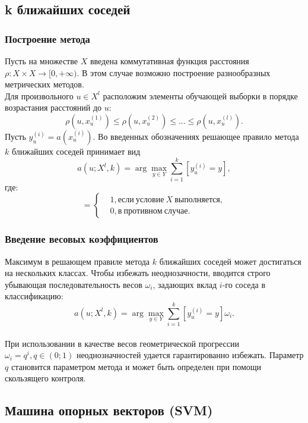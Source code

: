 \documentclass{beamer}
\begin{document}
\subsection{k ближайших соседей}
\begin{frame}
\end{frame}

\begin{frame}
\frametitle{Построение метода}
Пусть на множестве $X$ введена коммутативная функция расстояния $\rho:X\times X\rightarrow[0,+\infty)$. В этом случае возможно построение разнообразных метрических методов.\\
Для произвольного $u\in X^l$ расположим элементы обучающей выборки в порядке возрастания расстояний до $u$:
$$\rho(u,x_u^{(1)})\le\rho(u,x_u^{(2)})\le ... \le \rho(u, x_u^{(l)}).$$
Пусть $y_u^{(i)}=a(x_u^{(i)})$. Во введенных обозначениях решающее правило метода $k$ ближайших соседей принимает вид $$a(u; X^l, k)=\arg\max\limits_{y \in Y}\sum\limits_{i=1}^{k}[y_u^{(i)}=y],$$
где:
\begin{equation*}
	[X]=
	\begin{cases}
	&1, если\ условие\ X\ выполняется,\\
	&0, в\ противном\ случае.
	\end{cases}
\end{equation*}
\end{frame} 

\begin{frame}
\frametitle{Введение весовых коэффициентов}
Максимум в решающем правиле метода $k$ ближайших соседей может достигаться на нескольких классах. Чтобы избежать неоднозачности, вводится строго убывающая последовательность весов $\omega_i$, задающих вклад $i$-го соседа в классификацию:
$$a(u; X^l, k)=\arg\max\limits_{y \in Y}\sum\limits_{i=1}^{k}[y_u^{(i)}=y]\omega_i.$$\\
При использовании в качестве весов геометрической прогрессии $\omega_i=q^i, q\in(0;1)$ неоднозначностей удается гарантированно избежать. Параметр $q$ становится параметром метода и может быть определен при помощи скользящего контроля.
\end{frame} 

\subsection{Машина опорных векторов (SVM)}
\begin{frame}
\end{frame}
\end{document}
